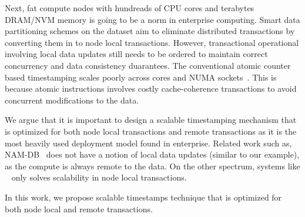 Next, fat compute nodes with hundreads of CPU cores and terabytes DRAM/NVM memory is going
to be a norm in enterprise computing. Smart data partitioning schemes on the dataset aim to
eliminate distributed transactions by converting them in to node local transactions.
However, transactional operational involving local data updates still needs to be ordered 
to maintain correct concurrency and data consistency duarantees. The conventional atomic
counter based timestamping scales poorly across cores and NUMA sockets~\cite{ordo}. This 
is because atomic instructions involves costly cache-coherence transactions to avoid 
concurrent modifications to the data.


We argue that it is important to design a scalable timestamping mechanism that is 
optimized for both node local transactions and remote transactions as it is the most 
heavily used deployment model found in enterprise.
Related work such as, NAM-DB~\cite{namdb} does not have a notion of local
data updates (similar to our example), as the compute is always remote to the data. On the other spectrum, 
systems like ~\cite{cicada} only solves scalability in node local transactions.

In this work, we propose scalable timestamps technique that is optimized for both
node local and remote transactions.

